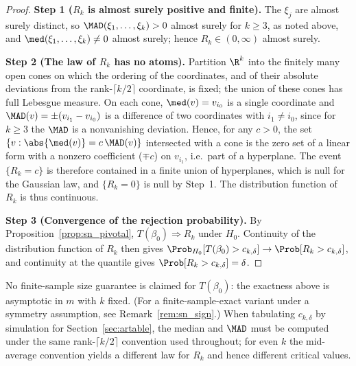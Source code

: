 \begin{proof}
\medskip\noindent\textbf{Step 1 ($R_k$ is almost surely positive and finite).} The $\xi_j$ are almost surely distinct, so $\MAD(\xi_1,\dots,\xi_k) > 0$ almost surely for $k \ge 3$, as noted above, and $\med(\xi_1,\dots,\xi_k) \neq 0$ almost surely; hence $R_k \in (0,\infty)$ almost surely.

\medskip\noindent\textbf{Step 2 (The law of $R_k$ has no atoms).} Partition $\R^k$ into the finitely many open cones on which the ordering of the coordinates, and of their absolute deviations from the rank-$\lceil k/2\rceil$ coordinate, is fixed; the union of these cones has full Lebesgue measure. On each cone, $\med(v) = v_{i_0}$ is a single coordinate and $\MAD(v) = \pm(v_{i_1} - v_{i_0})$ is a difference of two coordinates with $i_1 \neq i_0$, since for $k \ge 3$ the $\MAD$ is a nonvanishing deviation. Hence, for any $c > 0$, the set $\{v : \abs{\med(v)} = c\,\MAD(v)\}$ intersected with a cone is the zero set of a linear form with a nonzero coefficient ($\mp c$) on $v_{i_1}$, i.e.\ part of a hyperplane. The event $\{R_k = c\}$ is therefore contained in a finite union of hyperplanes, which is null for the Gaussian law, and $\{R_k = 0\}$ is null by Step~1. The distribution function of $R_k$ is thus continuous.

\medskip\noindent\textbf{Step 3 (Convergence of the rejection probability).} By Proposition~\ref{prop:sn_pivotal}, $T(\beta_0) \Rightarrow R_k$ under $H_0$. Continuity of the distribution function of $R_k$ then gives $\Prob_{H_0}[T(\beta_0) > c_{k,\delta}] \to \Prob[R_k > c_{k,\delta}]$, and continuity at the quantile gives $\Prob[R_k > c_{k,\delta}] = \delta$.
\end{proof}

\begin{remark}
\label{rem:ck_convention}
No finite-sample size guarantee is claimed for $T(\beta_0)$: the exactness above is asymptotic in $m$ with $k$ fixed. (For a finite-sample-exact variant under a symmetry assumption, see Remark~\ref{rem:sn_sign}.) When tabulating $c_{k,\delta}$ by simulation for Section~\ref{sec:artable}, the median and $\MAD$ must be computed under the same rank-$\lceil k/2\rceil$ convention used throughout; for even $k$ the mid-average convention yields a different law for $R_k$ and hence different critical values.
\end{remark}


